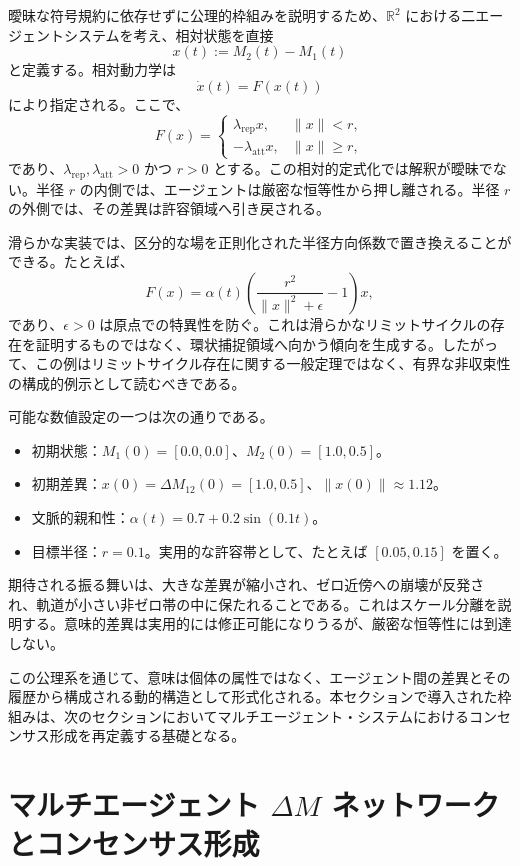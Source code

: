 \documentclass[11pt,a4paper]{article}
\theoremstyle{definition}
\begin{document}
曖昧な符号規約に依存せずに公理的枠組みを説明するため、$\mathbb{R}^2$ における二エージェントシステムを考え、相対状態を直接
\[
x(t) := M_2(t)-M_1(t)
\]
と定義する。相対動力学は
\[
\dot{x}(t)=F(x(t))
\]
により指定される。ここで、
\[
F(x)=
\begin{cases}
\lambda_{\mathrm{rep}}x, & \|x\|<r,\\
-\lambda_{\mathrm{att}}x, & \|x\|\geq r,
\end{cases}
\]
であり、$\lambda_{\mathrm{rep}},\lambda_{\mathrm{att}}>0$ かつ $r>0$ とする。この相対的定式化では解釈が曖昧でない。半径 $r$ の内側では、エージェントは厳密な恒等性から押し離される。半径 $r$ の外側では、その差異は許容領域へ引き戻される。

滑らかな実装では、区分的な場を正則化された半径方向係数で置き換えることができる。たとえば、
\[
F(x)=\alpha(t)\left(\frac{r^2}{\|x\|^2+\epsilon}-1\right)x,
\]
であり、$\epsilon>0$ は原点での特異性を防ぐ。これは滑らかなリミットサイクルの存在を証明するものではなく、環状捕捉領域へ向かう傾向を生成する。したがって、この例はリミットサイクル存在に関する一般定理ではなく、有界な非収束性の構成的例示として読むべきである。

可能な数値設定の一つは次の通りである。
\begin{itemize}
\item 初期状態：$M_1(0) = [0.0, 0.0]$、$M_2(0) = [1.0, 0.5]$。
\item 初期差異：$x(0)=\Delta M_{12}(0)=[1.0,0.5]$、$\|x(0)\|\approx 1.12$。
\item 文脈的親和性：$\alpha(t)=0.7+0.2\sin(0.1t)$。
\item 目標半径：$r=0.1$。実用的な許容帯として、たとえば $[0.05,0.15]$ を置く。
\end{itemize}

期待される振る舞いは、大きな差異が縮小され、ゼロ近傍への崩壊が反発され、軌道が小さい非ゼロ帯の中に保たれることである。これはスケール分離を説明する。意味的差異は実用的には修正可能になりうるが、厳密な恒等性には到達しない。

この公理系を通じて、意味は個体の属性ではなく、エージェント間の差異とその履歴から構成される動的構造として形式化される。本セクションで導入された枠組みは、次のセクションにおいてマルチエージェント・システムにおけるコンセンサス形成を再定義する基礎となる。

\section{マルチエージェント $\Delta M$ ネットワークとコンセンサス形成}
\end{document}
